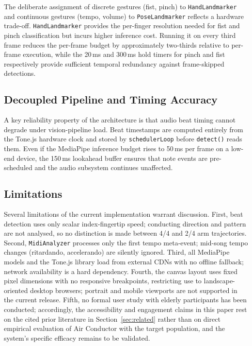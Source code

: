 \documentclass[conference]{IEEEtran}
\begin{document}
The deliberate assignment of discrete gestures (fist, pinch) to
\texttt{HandLandmarker} and continuous gestures (tempo, volume) to
\texttt{PoseLandmarker} reflects a hardware trade-off.
\texttt{HandLandmarker} provides the per-finger resolution needed for
fist and pinch classification but incurs higher inference cost. Running
it on every third frame reduces the per-frame budget by approximately
two-thirds relative to per-frame execution, while the 20\,ms and
300\,ms hold timers for pinch and fist respectively provide sufficient
temporal redundancy against frame-skipped detections.

\subsection{Decoupled Pipeline and Timing Accuracy}

A key reliability property of the architecture is that audio beat
timing cannot degrade under vision-pipeline load. Beat timestamps are
computed entirely from the Tone.js hardware clock and stored by
\texttt{schedulerLoop} before \texttt{detect()} reads them. Even if
the MediaPipe inference budget rises to 50\,ms per frame on a low-end
device, the 150\,ms lookahead buffer ensures that note events are
pre-scheduled and the audio subsystem continues unaffected.

\subsection{Limitations}

Several limitations of the current implementation warrant discussion.
First, beat detection uses only scalar index-fingertip speed; conducting
direction and pattern are not analysed, so no distinction is made
between 4/4 and 2/4 arm trajectories. Second, \texttt{MidiAnalyzer}
processes only the first tempo meta-event; mid-song tempo changes
(ritardando, accelerando) are silently ignored. Third, all MediaPipe
models and the Tone.js library load from external CDNs with no offline
fallback; network availability is a hard dependency. Fourth, the canvas
layout uses fixed pixel dimensions with no responsive breakpoints,
restricting use to landscape-oriented desktop browsers; portrait and
mobile viewports are not supported in the current release. Fifth, no
formal user study with elderly participants has been conducted;
accordingly, the accessibility and engagement claims in this paper rest
on the cited prior literature in Section~\ref{sec:related} rather than
on direct empirical evaluation of Air Conductor with the target
population, and the system's specific efficacy remains to be validated.
\end{document}
